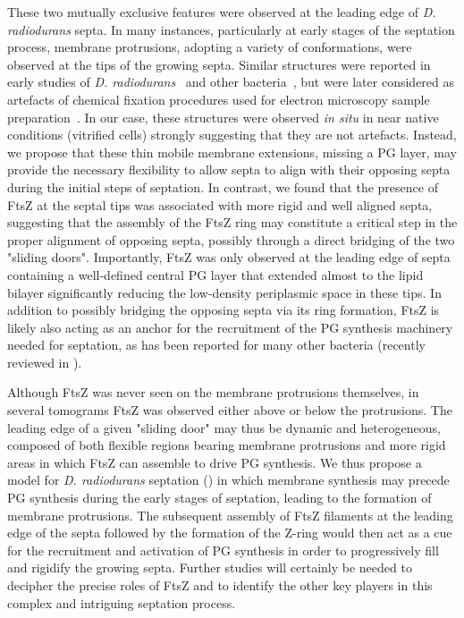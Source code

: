 These two mutually exclusive features were observed at the leading edge of \textit{D. radiodurans} septa.
In many instances, particularly at early stages of the septation process, membrane protrusions, adopting a variety of conformations, were observed at the tips of the growing septa.
Similar structures were reported in early studies of \textit{D. radiodurans}~\cite{thornleyFineStructureMicrococcus1965,sleytrStudyFreezeetchingFine1973} and other bacteria~\cite{suganumaStudiesFineStructure1966,pontefractMesosomesEscherichiaColi1969}, but were later considered as artefacts of chemical fixation procedures used for electron microscopy sample preparation~\cite{ryterContributionNewCryomethods1988,dubochetElectronMicroscopyFrozenhydrated1983,liedtkeHowAdvancesCryoelectron2022}.
In our case, these structures were observed \textit{in situ} in near native conditions (vitrified cells) strongly suggesting that they are not artefacts.
Instead, we propose that these thin mobile membrane extensions, missing a PG layer, may provide the necessary flexibility to allow septa to align with their opposing septa during the initial steps of septation.
In contrast, we found that the presence of FtsZ at the septal tips was associated with more rigid and well aligned septa, suggesting that the assembly of the FtsZ ring may constitute a critical step in the proper alignment of opposing septa, possibly through a direct bridging of the two "sliding doors".
Importantly, FtsZ was only observed at the leading edge of septa containing a well-defined central PG layer that extended almost to the lipid bilayer significantly reducing the low-density periplasmic space in these tips.
In addition to possibly bridging the opposing septa via its ring formation, FtsZ is likely also acting as an anchor for the recruitment of the PG synthesis machinery needed for septation, as has been reported for many other bacteria (recently reviewed in \citet{barrowsFtsZDynamicsBacterial2021,mcquillenInsightsStructureFunction2020,cameronInsightsAssemblyRegulation2024}).

Although FtsZ was never seen on the membrane protrusions themselves, in several tomograms FtsZ was observed either above or below the protrusions.
The leading edge of a given "sliding door" may thus be dynamic and heterogeneous, composed of both flexible regions bearing membrane protrusions and more rigid areas in which FtsZ can assemble to drive PG synthesis.
We thus propose a model for \textit{D. radiodurans} septation () in which membrane synthesis may precede PG synthesis during the early stages of septation, leading to the formation of membrane protrusions.
The subsequent assembly of FtsZ filaments at the leading edge of the septa followed by the formation of the Z-ring would then act as a cue for the recruitment and activation of PG synthesis in order to progressively fill and rigidify the growing septa.
Further studies will certainly be needed to decipher the precise roles of FtsZ and to identify the other key players in this complex and intriguing septation process.

